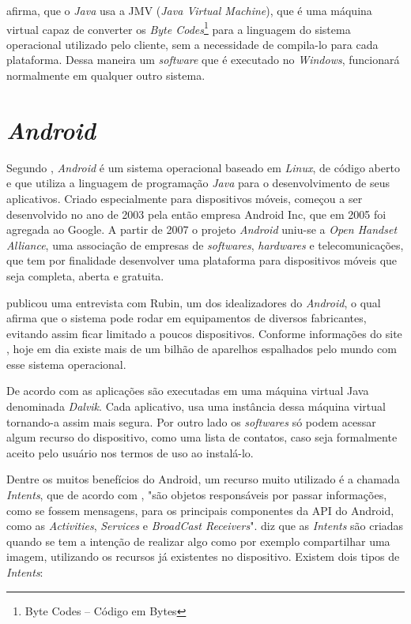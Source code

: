	\par {} afirma, que o \textit{Java} usa a JMV
(\textit{Java Virtual Machine}), que é uma máquina virtual capaz de converter
os \textit{Byte Codes}\footnote{Byte Codes – Código em Bytes } para a linguagem
do sistema operacional utilizado pelo cliente, sem a necessidade de compila-lo
para cada plataforma. Dessa maneira um \textit{software} que é executado no
\textit{Windows}, funcionará normalmente em qualquer outro sistema.

\section{\textit{Android}}

	\par Segundo , \textit{Android} é um sistema
operacional baseado em \textit{Linux}, de código aberto e que utiliza a
linguagem de programação \textit{Java} para o desenvolvimento de seus
aplicativos. Criado especialmente para dispositivos móveis, começou a
ser desenvolvido no ano de 2003 pela então empresa Android Inc, que em 2005 foi
agregada ao Google. A partir de 2007 o projeto \textit{Android} uniu-se a
\textit{Open Handset Alliance}, uma associação de empresas de
\textit{softwares}, \textit{hardwares} e telecomunicações, que tem por
finalidade desenvolver uma plataforma para dispositivos móveis que seja
completa, aberta e gratuita.

	\par {} publicou uma entrevista com Rubin, um dos
idealizadores do \textit{Android}, o qual afirma que o sistema pode rodar em
equipamentos de diversos fabricantes, evitando assim ficar limitado a poucos
dispositivos. Conforme informações do site , hoje em dia
existe mais de um bilhão de aparelhos espalhados pelo mundo com esse sistema
operacional.

	\par De acordo com  as aplicações são executadas em
uma máquina virtual Java denominada \textit{Dalvik}. Cada aplicativo, usa uma
instância dessa máquina virtual tornando-a assim mais segura. Por outro lado os
\textit{softwares} só podem acessar algum recurso do dispositivo, como uma
lista de contatos, caso seja formalmente aceito pelo usuário nos termos de uso
ao instalá-lo.

	\par Dentre os muitos benefícios do Android, um recurso muito utilizado é a
chamada \textit{Intents}, que de acordo com , "são
objetos responsáveis por passar informações, como se fossem mensagens, para os
principais componentes da API do Android, como as \textit{Activities},
\textit{Services} e \textit{BroadCast Receivers}". 
diz que as \textit{Intents} são criadas quando se tem a intenção de realizar
algo como por exemplo compartilhar uma imagem, utilizando os recursos já
existentes no dispositivo. Existem dois tipos de \textit{Intents}:
	
